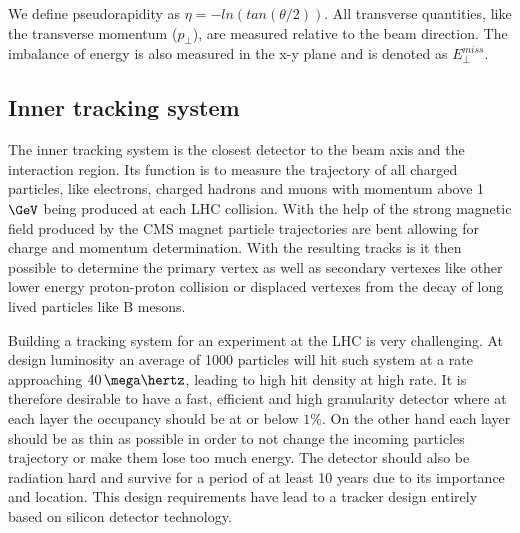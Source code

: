 We define pseudorapidity as $\eta = -ln(tan(\theta/2))$. All transverse quantities, like the transverse momentum ($p_\perp$), are measured relative to the beam direction. The imbalance of energy is also measured in the x-y plane and is denoted as $E^{miss}_\perp$.

\subsection{Inner tracking system}
\label{SUBSECTION:ExperimentalApparatus_CMS_Tracker}

%

The inner tracking system is the closest detector to the beam axis and the interaction region. Its function is to measure the trajectory of all charged particles, like electrons, charged hadrons and muons with momentum above 1 $\GeV$ being produced at each \gls{LHC} collision. With the help of the strong magnetic field produced by the \gls{CMS} magnet particle trajectories are bent allowing for charge and momentum determination. With the resulting tracks is it then possible to determine the primary vertex as well as secondary vertexes like other lower energy proton-proton collision or displaced vertexes from the decay of long lived particles like B mesons.

Building a tracking system for an experiment at the \gls{LHC} is very challenging. At design luminosity an average of 1000 particles will hit such system at a rate approaching $40\,\mega\hertz$, leading to high hit density at high rate. It is therefore desirable to have a fast, efficient and high granularity detector where at each layer the occupancy should be at or below $1\%$. On the other hand each layer should be as thin as possible in order to not change the incoming particles trajectory or make them lose too much energy. The detector should also be radiation hard and survive for a period of at least 10 years due to its importance and location. This design requirements have lead to a tracker design entirely based on silicon detector technology. 

